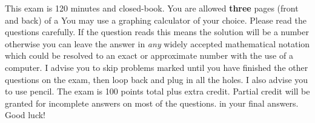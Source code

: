 \documentclass[12pt]{article}
\begin{document}
This exam is 120 minutes and closed-book. You are allowed \textbf{three} pages (front and back) of a  You may use a graphing calculator of your choice. Please read the questions carefully. If the question reads  this means the solution will be a number otherwise you can leave the answer in \textit{any} widely accepted mathematical notation which could be resolved to an exact or approximate number with the use of a computer. I advise you to skip problems marked  until you have finished the other questions on the exam, then loop back and plug in all the holes. I also advise you to use pencil. The exam is 100 points total plus extra credit. Partial credit will be granted for incomplete answers on most of the questions.  in your final answers. Good luck!

\pagebreak
\end{document}
